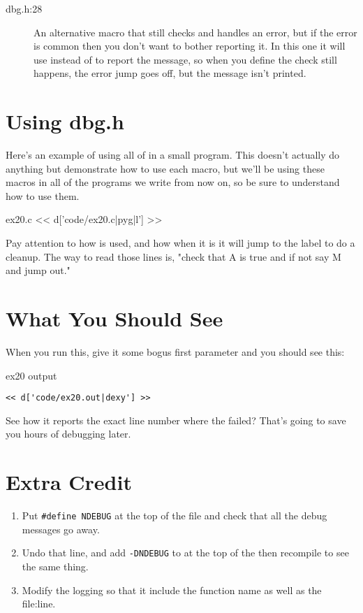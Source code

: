 \begin{description}
\item[dbg.h:28] An alternative macro  that still checks and
    handles an error, but if the error is common then you don't want to bother
    reporting it.  In this one it will use  instead of 
    to report the message, so when you define  the check still
    happens, the error jump goes off, but the message isn't printed.
\end{description}

\section{Using dbg.h}

Here's an example of using all of  in a small program.
This doesn't actually do anything but demonstrate how to use each
macro, but we'll be using these macros in all of the programs we
write from now on, so be sure to understand how to use them.

\begin{code}{ex20.c}
<< d['code/ex20.c|pyg|l'] >>
\end{code}

Pay attention to how  is used, and how when it is
 it will jump to the  label to do a cleanup.
The way to read those lines is, "check that A is true and if not say M
and jump out."


\section{What You Should See}

When you run this, give it some bogus first parameter and you should see
this:

\begin{code}{ex20 output}
\begin{lstlisting}
<< d['code/ex20.out|dexy'] >>
\end{lstlisting}
\end{code}

See how it reports the exact line number where the  failed?
That's going to save you hours of debugging later.

\section{Extra Credit}

\begin{enumerate}
\item Put \verb|#define NDEBUG| at the top of the file and check that all
    the debug messages go away.
\item Undo that line, and add \verb|-DNDEBUG| to  at the
    top of the  then recompile to see the same thing.
\item Modify the logging so that it include the function name as well
    as the file:line.
\end{enumerate}

